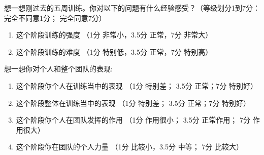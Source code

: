 \begin{CJK}{UTF8}{gbsn}
想一想刚过去的五周训练。你对以下的问题有什么经验感受？（等级划分1到7分：完全不同意1分； 完全同意7分）
\begin{enumerate}
  \item 这个阶段训练的强度 （1分 非常小，3.5分 正常，7分 非常大）
  \item 这个阶段训练的难度 （1分 特别低，3.5分 正常，7分 特别高）
\end{enumerate}

想一想你对个人和整个团队的表现:

\begin{enumerate}
  \item 这个阶段你个人在训练当中的表现 （1分 特别差； 3.5分 正常；7分 特别好）
  \item 这个阶段整体在训练当中的表现 （1分 特别差； 3.5分 正常；7分 特别好）
  \item 这个阶段你个人在团队发挥的作用 （1分 作用很小； 3.5分 正常作用； 7分 作用很大）
  \item 这个阶段你在团队的个人力量 （1分 比较小，3.5分 中等； 7分 比较大）
\end{enumerate}






                                                        \end{CJK}

